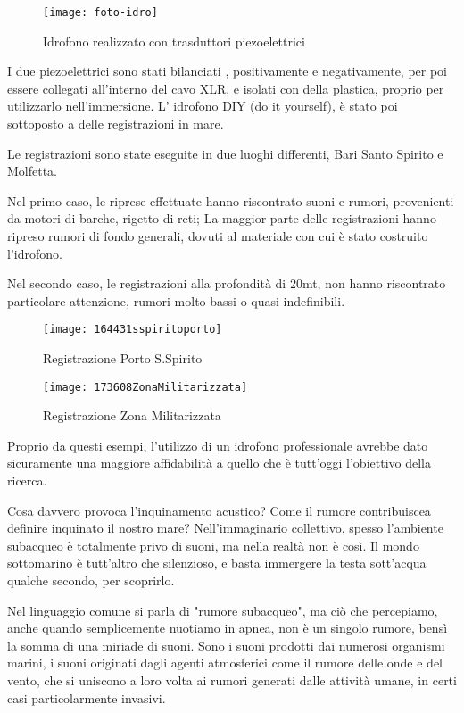 \begin{figure}[h]
\centering
\texttt{[image: foto-idro]}
\caption{Idrofono realizzato con trasduttori piezoelettrici}
\end{figure}

I due piezoelettrici sono stati bilanciati , positivamente e negativamente, per poi essere collegati all'interno del cavo XLR, e isolati con della plastica, proprio per utilizzarlo nell'immersione. 
L' idrofono DIY (do it yourself), è stato poi sottoposto a delle registrazioni in mare. 

Le registrazioni sono state eseguite in due luoghi differenti, Bari Santo Spirito e Molfetta. %

Nel primo caso, le riprese effettuate hanno riscontrato suoni e rumori, provenienti da motori di barche, rigetto di reti; 
La maggior parte delle registrazioni hanno ripreso rumori di fondo generali, dovuti al materiale con cui è stato costruito l'idrofono.

Nel secondo caso, le registrazioni alla profondità di 20mt, non hanno riscontrato particolare attenzione, rumori molto bassi o quasi indefinibili. 

\begin{figure}[h]
\centering
\texttt{[image: 164431sspiritoporto]}
\caption{Registrazione Porto S.Spirito}
\label{recsspirito}
\end{figure}

\begin{figure}[h]
\centering
\texttt{[image: 173608ZonaMilitarizzata]}
\caption{Registrazione Zona Militarizzata}
\label{recmilitari}
\end{figure}

Proprio da questi esempi, l'utilizzo di un idrofono professionale avrebbe dato sicuramente una maggiore affidabilità a quello che è tutt'oggi l'obiettivo della ricerca. 

Cosa davvero provoca l'inquinamento acustico? Come il rumore contribuiscea definire inquinato il nostro mare?
Nell'immaginario collettivo, spesso l'ambiente subacqueo è totalmente privo di suoni, ma nella realtà non è così. Il mondo sottomarino è tutt'altro che silenzioso, e basta immergere la testa sott'acqua qualche secondo, per scoprirlo.

Nel linguaggio comune si parla di "rumore subacqueo", ma ciò che percepiamo, anche quando semplicemente nuotiamo in apnea, non è un singolo rumore, bensì la somma di una miriade di suoni. Sono i suoni prodotti dai numerosi organismi marini, i suoni originati dagli agenti atmosferici come il rumore delle onde e del vento, che si uniscono a loro volta ai rumori generati dalle attività umane, in certi casi particolarmente invasivi.


